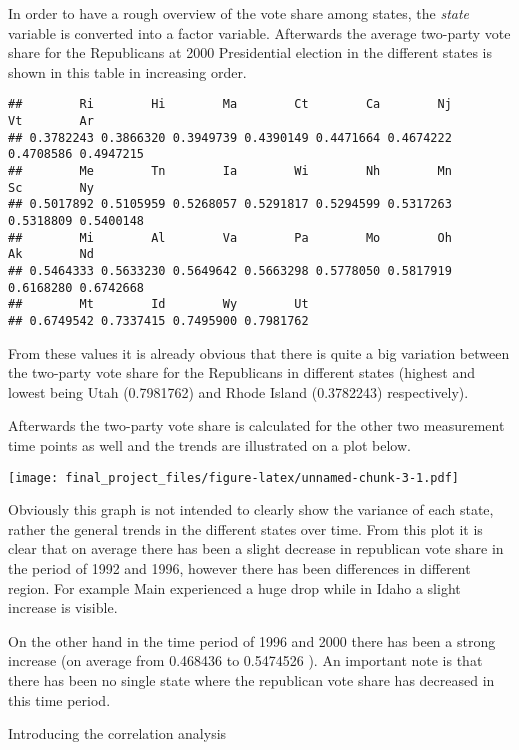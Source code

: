 \documentclass[
]{article}
\begin{document}
In order to have a rough overview of the vote share among states, the \emph{state} variable is converted into a factor variable. Afterwards the average two-party vote share for the Republicans at 2000 Presidential election in the different states is shown in this table in increasing order.

\begin{verbatim}
##        Ri        Hi        Ma        Ct        Ca        Nj        Vt        Ar 
## 0.3782243 0.3866320 0.3949739 0.4390149 0.4471664 0.4674222 0.4708586 0.4947215 
##        Me        Tn        Ia        Wi        Nh        Mn        Sc        Ny 
## 0.5017892 0.5105959 0.5268057 0.5291817 0.5294599 0.5317263 0.5318809 0.5400148 
##        Mi        Al        Va        Pa        Mo        Oh        Ak        Nd 
## 0.5464333 0.5633230 0.5649642 0.5663298 0.5778050 0.5817919 0.6168280 0.6742668 
##        Mt        Id        Wy        Ut 
## 0.6749542 0.7337415 0.7495900 0.7981762
\end{verbatim}

From these values it is already obvious that there is quite a big variation between the two-party vote share for the Republicans in different states (highest and lowest being Utah (0.7981762) and Rhode Island (0.3782243) respectively).

Afterwards the two-party vote share is calculated for the other two measurement time points as well and the trends are illustrated on a plot below.

\texttt{[image: final\_project\_files/figure-latex/unnamed-chunk-3-1.pdf]}

Obviously this graph is not intended to clearly show the variance of each state, rather the general trends in the different states over time. From this plot it is clear that on average there has been a slight decrease in republican vote share in the period of 1992 and 1996, however there has been differences in different region. For example Main experienced a huge drop while in Idaho a slight increase is visible.

On the other hand in the time period of 1996 and 2000 there has been a strong increase (on average from 0.468436 to 0.5474526 ). An important note is that there has been no single state where the republican vote share has decreased in this time period.

Introducing the correlation analysis
\end{document}
